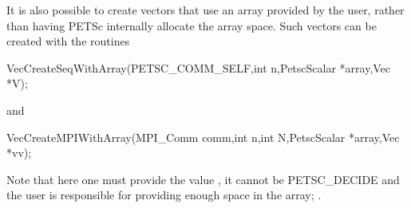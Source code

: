 It is also possible to create vectors that use an array provided by the user, 
rather than having PETSc internally allocate the array space. 
Such vectors can be created with the routines
\begin{tabbing}
  VecCreateSeqWithArray(PETSC\_COMM\_SELF,int n,PetscScalar *array,Vec *V);
\end{tabbing}
and   
\begin{tabbing}
  VecCreateMPIWithArray(MPI\_Comm comm,int n,int N,PetscScalar *array,Vec *vv);
\end{tabbing}
Note that here one must provide the value , it cannot be PETSC\_DECIDE and
the user is responsible for providing enough space in the array; .


